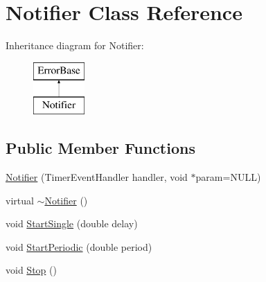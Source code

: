 \hypertarget{classNotifier}{
\section{Notifier Class Reference}
\label{classNotifier}
}
Inheritance diagram for Notifier:\begin{figure}[H]
\begin{center}
\leavevmode
\includegraphics[height=2.000000cm]{classNotifier}
\end{center}
\end{figure}
\subsection*{Public Member Functions}
\begin{DoxyCompactItemize}
\item 
\hyperlink{classNotifier_add626cbc00f8e50f98dc09758d19f85a}{Notifier} (TimerEventHandler handler, void $\ast$param=NULL)
\item 
virtual \hyperlink{classNotifier_acb1a245d3fbef36f2f96400150cef915}{$\sim$Notifier} ()
\item 
void \hyperlink{classNotifier_af62f654c1918a9c4256b201c5a9f78f7}{StartSingle} (double delay)
\item 
void \hyperlink{classNotifier_ad86c4d07ac2947b0fa51b2ec4ed95dbf}{StartPeriodic} (double period)
\item 
void \hyperlink{classNotifier_acbd1d398b7338e18d273a3acb6c1bf63}{Stop} ()
\end{DoxyCompactItemize}


